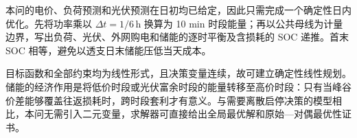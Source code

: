 本问的电价、负荷预测和光伏预测在日初均已给定，因此只需完成一个确定性日内优化。先将功率乘以 $\Delta t=1/6\,\mathrm{h}$ 换算为 10 min 时段能量；再以公共母线为计量边界，写出负荷、光伏、外网购电和储能的逐时平衡及含损耗的 SOC 递推。首末 SOC 相等，避免以透支日末储能压低当天成本。


目标函数和全部约束均为线性形式，且决策变量连续，故可建立确定性线性规划。储能的经济作用是将低价时段或光伏富余时段的能量转移至高价时段：只有当峰谷价差能够覆盖往返损耗时，跨时段套利才有意义。与需要离散启停决策的模型相比，本问无需引入二元变量，求解器可直接给出全局最优解和原始—对偶最优性证书。
